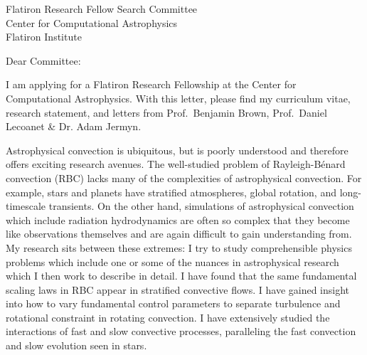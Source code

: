 \documentclass[12pt]{letter}
\begin{document}
\begin{letter}{
               Flatiron Research Fellow Search Committee \\
               Center for Computational Astrophysics \\
               Flatiron Institute 
           }

\opening{Dear Committee:}

    I am applying for a Flatiron Research Fellowship at the Center for Computational Astrophysics.
    With this letter, please find my curriculum vitae, research statement, and letters from Prof.~Benjamin Brown, Prof.~Daniel Lecoanet \& Dr. Adam Jermyn.

    Astrophysical convection is ubiquitous, but is poorly understood and therefore offers exciting research avenues.
    The well-studied problem of Rayleigh-B\'{e}nard convection (RBC) lacks many of the complexities of astrophysical convection.
    For example, stars and planets have stratified atmospheres, global rotation, and long-timescale transients.
    On the other hand, simulations of astrophysical convection which include radiation hydrodynamics are often so complex that they become like observations themselves and are again difficult to gain understanding from.
    My research sits between these extremes: I try to study comprehensible physics problems which include one or some of the nuances in astrophysical research which I then work to describe in detail.
    I have found that the same fundamental scaling laws in RBC appear in stratified convective flows.
    I have gained insight into how to vary fundamental control parameters to separate turbulence and rotational constraint in rotating convection.
    I have extensively studied the interactions of fast and slow convective processes, paralleling the fast convection and slow evolution seen in stars.


\end{letter}
\end{document}
